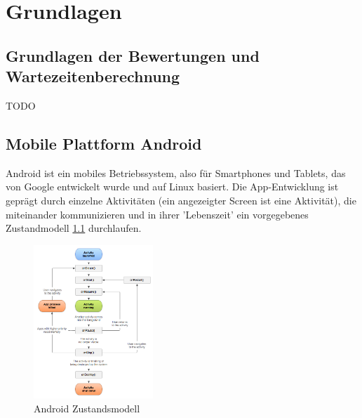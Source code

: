 \chapter{Grundlagen}
\label{cha:grundlagen}

\section{Grundlagen der Bewertungen und Wartezeitenberechnung}
\label{sec:grundlagen:bewertugnen}

TODO


\section{Mobile Plattform Android}
\label{sec:grundlagen:plattforml}

Android ist ein mobiles Betriebssystem, also für Smartphones und Tablets, das von Google entwickelt wurde und auf Linux basiert. Die App-Entwicklung ist geprägt durch einzelne Aktivitäten (ein angezeigter Screen ist eine Aktivität), die miteinander kommunizieren und in ihrer 'Lebenszeit' ein vorgegebenes Zustandmodell \ref{figure:androidZustandsmodell} durchlaufen.

\begin{figure}[htp]
	\centering
  	\includegraphics[width=0.4\textwidth]{img/modelle/AndroidZustandsmodell.png}
	\caption{Android Zustandsmodell}
	\label{figure:androidZustandsmodell}
\end{figure}

